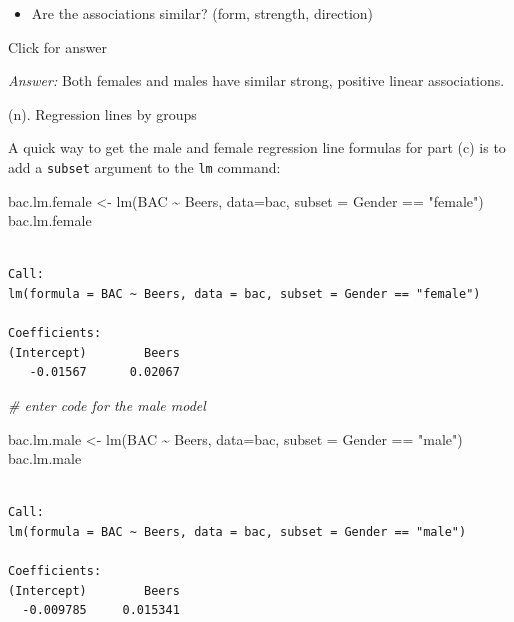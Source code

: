\documentclass[
]{book}
\newenvironment{Shaded}{\begin{snugshade}}{\end{snugshade}}
\newcommand{\AttributeTok}[1]{\textcolor[rgb]{0.77,0.63,0.00}{#1}}
\newcommand{\CommentTok}[1]{\textcolor[rgb]{0.56,0.35,0.01}{\textit{#1}}}
\newcommand{\FunctionTok}[1]{\textcolor[rgb]{0.00,0.00,0.00}{#1}}
\newcommand{\NormalTok}[1]{#1}
\newcommand{\OtherTok}[1]{\textcolor[rgb]{0.56,0.35,0.01}{#1}}
\newcommand{\SpecialCharTok}[1]{\textcolor[rgb]{0.00,0.00,0.00}{#1}}
\newcommand{\StringTok}[1]{\textcolor[rgb]{0.31,0.60,0.02}{#1}}
\providecommand{\tightlist}{%
  \setlength{\itemsep}{0pt}\setlength{\parskip}{0pt}}
\begin{document}
\begin{itemize}
\tightlist
\item
  Are the associations similar? (form, strength, direction)
\end{itemize}

Click for answer

\emph{Answer:} Both females and males have similar strong, positive linear associations.

(n). Regression lines by groups

A quick way to get the male and female regression line formulas for part (c) is to add a \texttt{subset} argument to the \texttt{lm} command:

\begin{Shaded}
\begin{Highlighting}[]
\NormalTok{bac.lm.female }\OtherTok{\textless{}{-}} \FunctionTok{lm}\NormalTok{(BAC }\SpecialCharTok{\textasciitilde{}}\NormalTok{ Beers, }\AttributeTok{data=}\NormalTok{bac, }\AttributeTok{subset =}\NormalTok{ Gender }\SpecialCharTok{==} \StringTok{"female"}\NormalTok{)}
\NormalTok{bac.lm.female }
\end{Highlighting}
\end{Shaded}

\begin{verbatim}

Call:
lm(formula = BAC ~ Beers, data = bac, subset = Gender == "female")

Coefficients:
(Intercept)        Beers  
   -0.01567      0.02067  
\end{verbatim}

\begin{Shaded}
\begin{Highlighting}[]
\CommentTok{\# enter code for the male model}

\NormalTok{bac.lm.male }\OtherTok{\textless{}{-}} \FunctionTok{lm}\NormalTok{(BAC }\SpecialCharTok{\textasciitilde{}}\NormalTok{ Beers, }\AttributeTok{data=}\NormalTok{bac, }\AttributeTok{subset =}\NormalTok{ Gender }\SpecialCharTok{==} \StringTok{"male"}\NormalTok{)}
\NormalTok{bac.lm.male}
\end{Highlighting}
\end{Shaded}

\begin{verbatim}

Call:
lm(formula = BAC ~ Beers, data = bac, subset = Gender == "male")

Coefficients:
(Intercept)        Beers  
  -0.009785     0.015341  
\end{verbatim}
\end{document}
